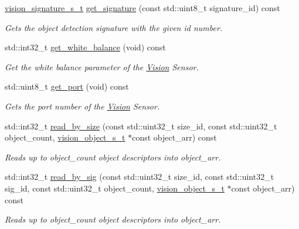 \begin{DoxyCompactItemize}
\hyperlink{vision_8h_a135c729c7277f6cc019c2924088a5fd5}{vision\+\_\+signature\+\_\+s\+\_\+t} \hyperlink{classpros_1_1Vision_af1d1bc18fd7dacfd23d9dfc403b7d419}{get\+\_\+signature} (const std\+::uint8\+\_\+t signature\+\_\+id) const
\begin{DoxyCompactList}\small\item\em Gets the object detection signature with the given id number. \end{DoxyCompactList}\item 
std\+::int32\+\_\+t \hyperlink{classpros_1_1Vision_a7a89ad6812bfd46e24e69e1dc2f55039}{get\+\_\+white\+\_\+balance} (void) const
\begin{DoxyCompactList}\small\item\em Get the white balance parameter of the \hyperlink{classpros_1_1Vision}{Vision} Sensor. \end{DoxyCompactList}\item 
std\+::uint8\+\_\+t \hyperlink{classpros_1_1Vision_af9958688590139df7b1227765f63d5ce}{get\+\_\+port} (void) const
\begin{DoxyCompactList}\small\item\em Gets the port number of the \hyperlink{classpros_1_1Vision}{Vision} Sensor. \end{DoxyCompactList}\item 
std\+::int32\+\_\+t \hyperlink{classpros_1_1Vision_adb2a3e6a7c483cda5a32a341d5be0cc6}{read\+\_\+by\+\_\+size} (const std\+::uint32\+\_\+t size\+\_\+id, const std\+::uint32\+\_\+t object\+\_\+count, \hyperlink{vision_8h_ae619120558539c13e53b5a6f42fb4375}{vision\+\_\+object\+\_\+s\+\_\+t} $\ast$const object\+\_\+arr) const
\begin{DoxyCompactList}\small\item\em Reads up to object\+\_\+count object descriptors into object\+\_\+arr. \end{DoxyCompactList}\item 
std\+::int32\+\_\+t \hyperlink{classpros_1_1Vision_af5bb50d41d63d6ff9cf4f6a642046fca}{read\+\_\+by\+\_\+sig} (const std\+::uint32\+\_\+t size\+\_\+id, const std\+::uint32\+\_\+t sig\+\_\+id, const std\+::uint32\+\_\+t object\+\_\+count, \hyperlink{vision_8h_ae619120558539c13e53b5a6f42fb4375}{vision\+\_\+object\+\_\+s\+\_\+t} $\ast$const object\+\_\+arr) const
\begin{DoxyCompactList}\small\item\em Reads up to object\+\_\+count object descriptors into object\+\_\+arr. \end{DoxyCompactList}\item 

\end{DoxyCompactItemize}
